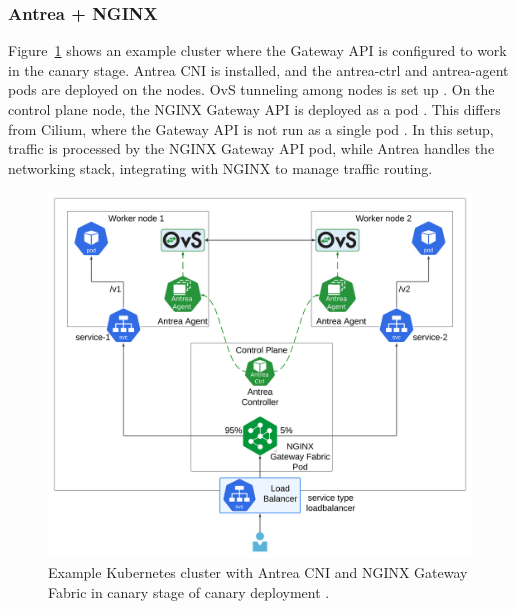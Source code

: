 \subsubsection{Antrea + NGINX}
\label{subsection:antreaIngress}

Figure~\ref{fig:canaryAntreaImg} shows an example cluster where the Gateway API is configured to work in the canary stage. Antrea CNI is installed, and the antrea-ctrl and antrea-agent pods are deployed on the nodes. OvS tunneling among nodes is set up \cite{AntreaDocs}. On the control plane node, the NGINX Gateway API is deployed as a pod \cite{NGINX}. This differs from Cilium, where the Gateway API is not run as a single pod \cite{CiliumDocs}. In this setup, traffic is processed by the NGINX Gateway API pod, while Antrea handles the networking stack, integrating with NGINX to manage traffic routing.

\begin{figure}[H]
    \centering
    \includegraphics[width=1\columnwidth]{images/antrea-nginx_hq.png}
    \caption{Example Kubernetes cluster with Antrea CNI and NGINX Gateway Fabric in canary stage of canary deployment \cite{KubernetesDocs}\cite{AntreaDocs}.}
    \label{fig:canaryAntreaImg}
\end{figure}

